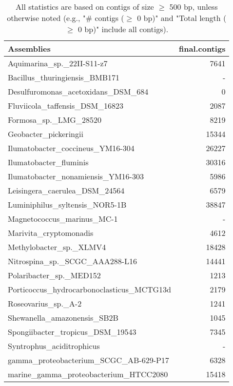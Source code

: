 \documentclass[12pt,a4paper]{article}
\begin{document}
\begin{table}[ht]
\begin{center}
\caption{All statistics are based on contigs of size $\geq$ 500 bp, unless otherwise noted (e.g., "\# contigs ($\geq$ 0 bp)" and "Total length ($\geq$ 0 bp)" include all contigs).}
\begin{tabular}{|l*{1}{|r}|}
\hline
Assemblies & final.contigs \\ \hline
Aquimarina\_sp.\_22II-S11-z7 & 7641 \\ \hline
Bacillus\_thuringiensis\_BMB171 & - \\ \hline
Desulfuromonas\_acetoxidans\_DSM\_684 & 0 \\ \hline
Fluviicola\_taffensis\_DSM\_16823 & 2087 \\ \hline
Formosa\_sp.\_LMG\_28520 & 8219 \\ \hline
Geobacter\_pickeringii & 15344 \\ \hline
Ilumatobacter\_coccineus\_YM16-304 & 26227 \\ \hline
Ilumatobacter\_fluminis & 30316 \\ \hline
Ilumatobacter\_nonamiensis\_YM16-303 & 5986 \\ \hline
Leisingera\_caerulea\_DSM\_24564 & 6579 \\ \hline
Luminiphilus\_syltensis\_NOR5-1B & 38847 \\ \hline
Magnetococcus\_marinus\_MC-1 & - \\ \hline
Marivita\_cryptomonadis & 4612 \\ \hline
Methylobacter\_sp.\_XLMV4 & 18428 \\ \hline
Nitrospina\_sp.\_SCGC\_AAA288-L16 & 14441 \\ \hline
Polaribacter\_sp.\_MED152 & 1213 \\ \hline
Porticoccus\_hydrocarbonoclasticus\_MCTG13d & 2179 \\ \hline
Roseovarius\_sp.\_A-2 & 1241 \\ \hline
Shewanella\_amazonensis\_SB2B & 1045 \\ \hline
Spongiibacter\_tropicus\_DSM\_19543 & 7345 \\ \hline
Syntrophus\_aciditrophicus & - \\ \hline
gamma\_proteobacterium\_SCGC\_AB-629-P17 & 6328 \\ \hline
marine\_gamma\_proteobacterium\_HTCC2080 & 15418 \\ \hline
\end{tabular}
\end{center}
\end{table}
\end{document}
